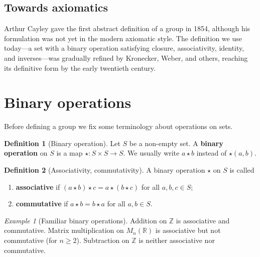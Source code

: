 \documentclass[12pt,a4paper,openany]{book}
\theoremstyle{definition}
\newtheorem{definition}{Definition}[chapter]
\theoremstyle{remark}
\newtheorem{example}{Example}[chapter]
\newcommand{\Z}{\mathbb{Z}}
\newcommand{\R}{\mathbb{R}}
\begin{document}
\subsection*{Towards axiomatics}

Arthur Cayley gave the first abstract definition of a
group in 1854, although his formulation was not yet in the modern axiomatic
style.  The definition we use today---a set with a binary operation
satisfying closure, associativity, identity, and inverses---was gradually
refined by Kronecker, Weber, and others, reaching its definitive form by the
early twentieth century.

\section{Binary operations}
\label{sec:ch1-binary-ops}

Before defining a group we fix some terminology about operations on sets.

\begin{definition}[Binary operation]
\label{def:binary-op}
Let $S$ be a non-empty set.  A \textbf{binary operation} on $S$ is a map
$\star\colon S\times S\to S$.  We usually write $a\star b$ instead of
$\star(a,b)$.
\end{definition}

\begin{definition}[Associativity, commutativity]
\label{def:assoc-comm}
A binary operation $\star$ on $S$ is called
\begin{enumerate}[label=(\roman*)]
  \item \textbf{associative} if $(a\star b)\star c = a\star(b\star c)$ for
    all $a,b,c\in S$;
  \item \textbf{commutative} if $a\star b = b\star a$ for all $a,b\in S$.
\end{enumerate}
\end{definition}

\begin{example}[Familiar binary operations]
\label{ex:familiar-ops}
Addition on $\Z$ is associative and commutative.  Matrix multiplication on
$M_n(\R)$ is associative but not commutative (for $n\ge 2$).  Subtraction
on $\Z$ is neither associative nor commutative.
\end{example}

\end{document}
